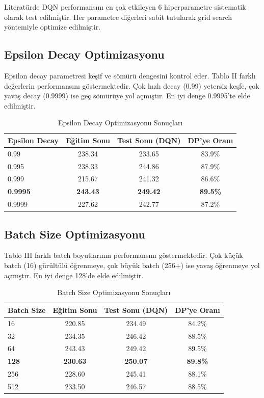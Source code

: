 \documentclass[onecolumn]{IEEEtran}
\begin{document}
Literatürde DQN performansını en çok etkileyen 6 hiperparametre sistematik olarak test edilmiştir. Her parametre diğerleri sabit tutularak grid search yöntemiyle optimize edilmiştir.

\subsection{Epsilon Decay Optimizasyonu}

Epsilon decay parametresi keşif ve sömürü dengesini kontrol eder. Tablo II farklı değerlerin performansını göstermektedir. Çok hızlı decay (0.99) yetersiz keşfe, çok yavaş decay (0.9999) ise geç sömürüye yol açmıştır. En iyi denge 0.9995'te elde edilmiştir.

\begin{table}[h]
\centering
\caption{Epsilon Decay Optimizasyonu Sonuçları}
\begin{tabular}{lccc}
\toprule
\textbf{Epsilon Decay} & \textbf{Eğitim Sonu} & \textbf{Test Sonu (DQN)} & \textbf{DP'ye Oranı} \\
\midrule
0.99 & 238.34 & 233.65 & 83.9\% \\
0.995 & 238.33 & 244.86 & 87.9\% \\
0.999 & 215.67 & 241.32 & 86.6\% \\
\textbf{0.9995} & \textbf{243.43} & \textbf{249.42} & \textbf{89.5\%} \\
0.9999 & 227.62 & 242.77 & 87.2\% \\
\bottomrule
\end{tabular}
\label{tab:epsilon}
\end{table}

\subsection{Batch Size Optimizasyonu}

Tablo III farklı batch boyutlarının performansını göstermektedir. Çok küçük batch (16) gürültülü öğrenmeye, çok büyük batch (256+) ise yavaş öğrenmeye yol açmıştır. En iyi denge 128'de elde edilmiştir.

\begin{table}[h]
\centering
\caption{Batch Size Optimizasyonu Sonuçları}
\begin{tabular}{lccc}
\toprule
\textbf{Batch Size} & \textbf{Eğitim Sonu} & \textbf{Test Sonu (DQN)} & \textbf{DP'ye Oranı} \\
\midrule
16 & 220.85 & 234.49 & 84.2\% \\
32 & 234.35 & 246.42 & 88.5\% \\
64 & 243.43 & 249.42 & 89.5\% \\
\textbf{128} & \textbf{230.63} & \textbf{250.07} & \textbf{89.8\%} \\
256 & 228.60 & 245.41 & 88.1\% \\
512 & 233.50 & 246.57 & 88.5\% \\
\bottomrule
\end{tabular}
\label{tab:batchsize}
\end{table}
\end{document}
